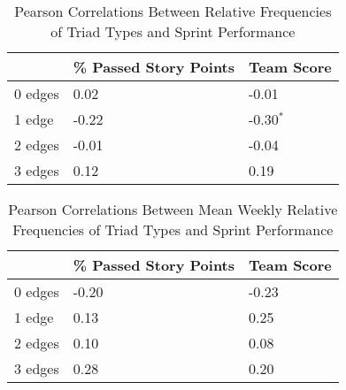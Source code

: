 \begin{table}
\caption{Pearson Correlations Between Relative Frequencies of Triad Types and Sprint Performance}
    \begin{center}
         \label{tbl:triad_census}
        \begin{tabular}{|p{} | p{} | p{}|} 
            \hline
            & \textbf{\% Passed Story Points} & \textbf{Team Score} 
            \\ \hline
            0 edges & 0.02 & -0.01
            \\ \hline
            1 edge & -0.22 & -0.30$^{*}$
            \\ \hline
            2 edges & -0.01 & -0.04
            \\ \hline
            3 edges & 0.12 & 0.19
            \\ \hline
        \end{tabular}  
    \end{center}
\end{table}

\begin{table}
    \caption{Pearson Correlations Between Mean Weekly Relative Frequencies of Triad Types and Sprint Performance}
    \begin{center}
        \label{tbl:triad_census_avg}
        \begin{tabular}{|p{} | p{} | p{}|} 
            \hline
            & \textbf{\% Passed Story Points} & \textbf{Team Score} 
            \\ \hline
            0 edges & -0.20 & -0.23
            \\ \hline
            1 edge & 0.13 & 0.25
            \\ \hline
            2 edges & 0.10 & 0.08
            \\ \hline
            3 edges & 0.28 & 0.20
            \\ \hline
        \end{tabular}
    \end{center}
\end{table}

